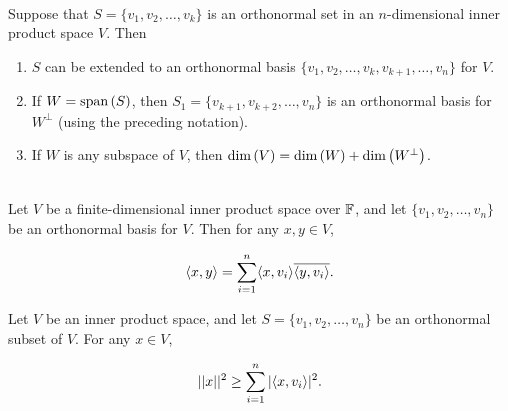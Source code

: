 \begin{theorem}
	\hfill\\
	Suppose that $S = \{v_1, v_2, \dots, v_k\}$ is an orthonormal set in an $n$-dimensional inner product space $V$. Then

	\begin{enumerate}
		\item $S$ can be extended to an orthonormal basis $\{v_1, v_2, \dots, v_k, v_{k+1}, \dots, v_n\}$ for $V$.
		\item If $W = \text{span}\left(S\right)$, then $S_1 = \{v_{k+1}, v_{k+2}, \dots, v_n\}$ is an orthonormal basis for $W^\perp$ (using the preceding notation).
		\item If $W$ is any subspace of $V$, then $\text{dim}\left(V\right) = \text{dim}\left(W\right) + \text{dim}\left(W^\perp\right)$.
	\end{enumerate}
\end{theorem}

\begin{definition}
	\hfill\\
	Let $V$ be a finite-dimensional inner product space over $\mathbb{F}$, and let $\{v_1, v_2, \dots, v_n\}$ be an orthonormal basis for $V$. Then for any $x,y \in V$,

	\[\langle x,y\rangle = \sum_{i=1}^{n}\langle x,v_i\rangle\overline{\langle y,v_i\rangle}.\]
\end{definition}

\begin{definition}
	Let $V$ be an inner product space, and let $S = \{v_1, v_2, \dots, v_n\}$ be an orthonormal subset of $V$. For any $x \in V$,

	\[||x||^2 \geq \sum_{i=1}^{n}|\langle x,v_i\rangle|^2.\]
\end{definition}

